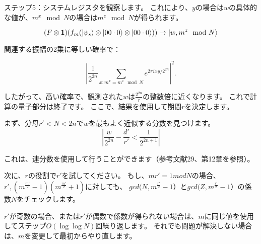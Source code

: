 ステップ5：システムレジスタを観察します。 これにより、$y$の場合は$w$の具体的な値が、$m^x \mod N$の場合は$m^z \mod N$が得られます。

\begin{equation}
\label{113}
(F \otimes \mathbf{1} )(f_m ( \ket{\psi_s} \otimes  \ket{00 \cdot 0} \otimes \ket{00 \cdot 0} ))
\to
\ket{w, m^z \mod N} 
\end{equation}

関連する振幅の2乗に等しい確率で：

\begin{equation}
\label{114}
| \frac{1}{2^{2n}}
\sum_{x: m^x = m^z \mod N}
e^{2 \pi i xy / 2^{2n}}|^2.
\end{equation}

したがって、高い確率で、観測された$w$は$\frac{2^{2n}}{r}$の整数倍に近くなります。 これで計算の量子部分は終了です。 ここで、結果を使用して期間$r$を決定します。

まず、分母$r' < N < 2n$で$w$を最もよく近似する分数を見つけます。
\begin{equation}
\label{114}
| \frac{w}{2^{2n}} - \frac{d'}{r'}
<
 \frac{1}{2^{2n+1}} |
\end{equation}

 これは、連分数を使用して行うことができます（参考文献29、第12章を参照）。
 
 次に、$r$の役割で$r'$を試してください。 もし、$mr '= 1 mod N$の場合、$r', (m^{\frac{m'}{2}} -1)(m^{\frac{m'}{2}} +1)$に対しても、
$gcd(N,m^{\frac{r'}{2}}-1）$と$gcd(Z,m^{\frac{r'}{2}}-1）$の係数$N$をチェックします。

$r'$が奇数の場合、または$r'$が偶数で係数が得られない場合は、$m$に同じ値を使用してステップ$O (\log \log N)$回繰り返します。 それでも問題が解決しない場合は、$m$を変更して最初からやり直します。
